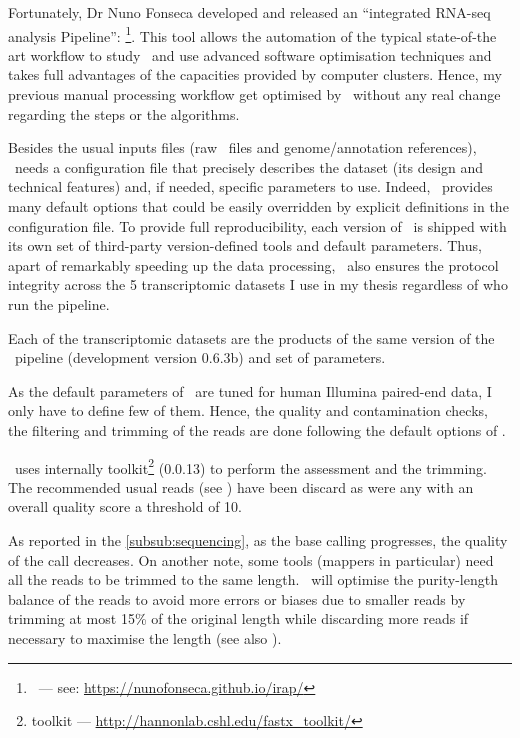 Fortunately, Dr Nuno Fonseca developed and released
an ``integrated RNA-seq analysis Pipeline'': \irap\footnote{\irap\ ---
see: \href{https://nunofonseca.github.io/irap/}%
{https://nunofonseca.github.io/irap/}}.
This tool allows the automation of the typical
state-of-the art workflow to study
\Rnaseq\ and use advanced software optimisation techniques and takes full
advantages of the capacities provided by computer clusters. Hence, my previous
manual processing workflow get optimised by \irap\ without any real change
regarding the steps or the algorithms. %

Besides the usual inputs files (raw \Rnaseq\ files and genome/annotation
references), \irap\ needs a configuration file that precisely describes the
dataset (its design and technical features) and, if needed, specific parameters
to use. Indeed, \irap\ provides many default options that could be easily
overridden by explicit definitions in the configuration file. To provide
full reproducibility, each version of \irap\ is shipped with
its own set of third-party version-defined tools and default parameters. Thus,
apart of remarkably speeding up the data processing, \irap\
also ensures the protocol integrity across the 5 transcriptomic datasets I
use in my thesis regardless of who run the pipeline.

Each of the transcriptomic datasets are the products of the same version of
the \irap\ pipeline (development version 0.6.3b) and set of parameters.

As the default parameters of \irap\ are tuned for human Illumina paired-end data,
I only have to define few of them. Hence, the quality and contamination checks,
the filtering and trimming of the reads are done following the default options
of \irap.


\irap\ uses internally  toolkit\footnote{ toolkit ---
\href{http://hannonlab.cshl.edu/fastx\_toolkit/}%
{http://hannonlab.cshl.edu/fastx\_toolkit/}} (0.0.13) to perform the
assessment and the trimming. The recommended usual reads (see )
have been discard as were any with an overall quality score a threshold of 10.

As reported in the \cref{subsub:sequencing}, as the base calling progresses,
the quality of the call decreases.
On another note, some tools (mappers in particular) need
all the reads to be trimmed to the same length. \irap\ will optimise the
purity-length balance of the reads to avoid more errors or biases due to smaller
reads \mycite{Trimwisely} by trimming at most 15\% of the original length while
discarding more reads if necessary to maximise the length (see also
\Cref{subsub:trim}).

